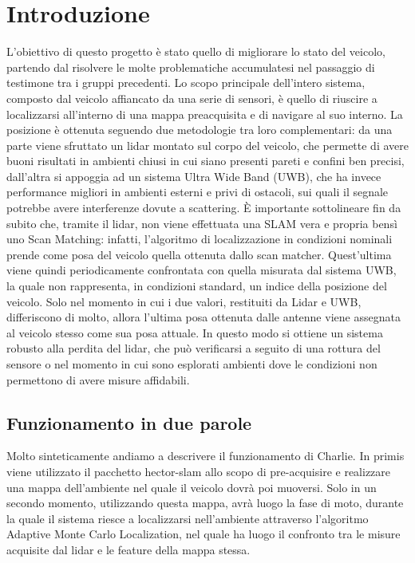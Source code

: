 
\graphicspath{{./figs/}}


	


\newpage\null\thispagestyle{empty}\newpage
\newpage
{}
\setcounter{page}{1}
\tableofcontents
\newpage

%
%


\section*{Introduzione}
L'obiettivo di questo progetto \`e stato quello di migliorare lo stato del veicolo, partendo dal risolvere le molte problematiche accumulatesi nel passaggio di 
testimone tra i gruppi precedenti.
Lo scopo principale dell'intero sistema, composto dal veicolo affiancato da una serie di sensori, \`e quello di riuscire a localizzarsi all'interno di una mappa 
preacquisita e di navigare al suo interno.
La posizione \`e ottenuta seguendo due metodologie tra loro complementari: da una parte viene sfruttato un lidar montato sul corpo del veicolo, che permette di 
avere buoni risultati in ambienti chiusi in cui siano presenti pareti e confini ben precisi, dall'altra si appoggia ad un sistema Ultra Wide Band (UWB), che ha 
invece performance migliori in ambienti esterni e privi di ostacoli, sui quali il segnale potrebbe avere interferenze dovute a scattering.
\`E importante sottolineare fin da subito che, tramite il lidar, non viene effettuata una SLAM vera e propria bens\`i uno Scan Matching: infatti, l'algoritmo di 
localizzazione in condizioni nominali prende come posa del veicolo quella ottenuta dallo scan matcher. 
Quest'ultima viene quindi periodicamente confrontata con quella misurata dal sistema UWB, la quale non rappresenta, in condizioni standard, un indice della posizione 
del veicolo. Solo nel momento in cui i due valori, restituiti da Lidar e UWB, differiscono di molto, allora l'ultima posa ottenuta dalle antenne viene assegnata al 
veicolo stesso come sua posa attuale.
In questo modo si ottiene un sistema robusto alla perdita del lidar, che pu\`o verificarsi a seguito di una rottura del sensore o nel momento in cui sono esplorati 
ambienti dove le condizioni non permettono di avere misure affidabili.

\subsection*{Funzionamento in due parole}
Molto sinteticamente andiamo a descrivere il funzionamento di Charlie. 
In primis viene utilizzato il pacchetto hector-slam allo scopo di pre-acquisire e realizzare una mappa dell'ambiente nel quale il veicolo dovrà poi muoversi. 
Solo in un secondo momento, utilizzando questa mappa, avrà luogo la fase di moto, durante la quale il sistema riesce a localizzarsi nell'ambiente attraverso 
l'algoritmo Adaptive Monte Carlo Localization, nel quale ha luogo il confronto tra le misure acquisite dal lidar e le feature della mappa stessa. 

